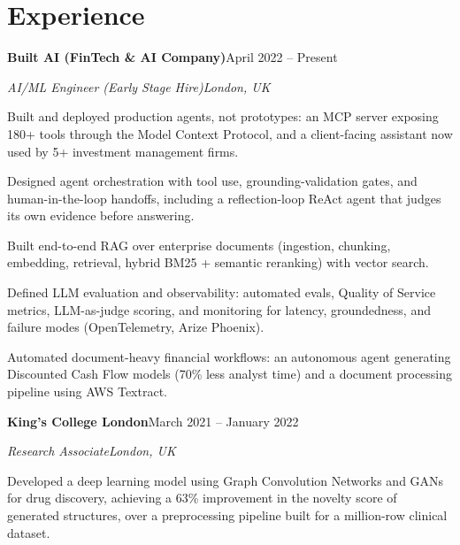 \documentclass[10pt,a4paper]{article}
\newcommand{\entry}[4]{%
  {\color{company}\bfseries #1}\hfill {\color{muted}#2}\par
  \vspace{1pt}
  {\itshape #3}\hfill {\color{muted}\itshape #4}\par
  \vspace{3pt}%
}
\begin{document}
\section{Experience}
\entry{Built AI (FinTech \& AI Company)}{April 2022 -- Present}{AI/ML Engineer (Early Stage Hire)}{London, UK}
\begin{tight}
  \item Built and deployed production agents, not prototypes: an MCP server exposing 180+ tools through the Model Context Protocol, and a client-facing assistant now used by 5+ investment management firms.
  \item Designed agent orchestration with tool use, grounding-validation gates, and human-in-the-loop handoffs, including a reflection-loop ReAct agent that judges its own evidence before answering.
  \item Built end-to-end RAG over enterprise documents (ingestion, chunking, embedding, retrieval, hybrid BM25 + semantic reranking) with vector search.
  \item Defined LLM evaluation and observability: automated evals, Quality of Service metrics, LLM-as-judge scoring, and monitoring for latency, groundedness, and failure modes (OpenTelemetry, Arize Phoenix).
  \item Automated document-heavy financial workflows: an autonomous agent generating Discounted Cash Flow models (70\% less analyst time) and a document processing pipeline using AWS Textract.
\end{tight}

\entry{King's College London}{March 2021 -- January 2022}{Research Associate}{London, UK}
\begin{tight}
  \item Developed a deep learning model using Graph Convolution Networks and GANs for drug discovery, achieving a 63\% improvement in the novelty score of generated structures, over a preprocessing pipeline built for a million-row clinical dataset.
\end{tight}

\end{document}
